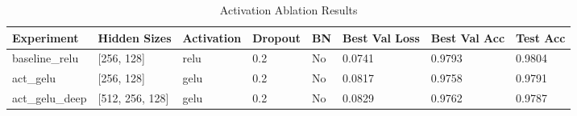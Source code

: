 \begin{table}[t]
    \centering
    \caption{Activation Ablation Results}
    \label{tab:activation_ablation}
    \begin{tabular}{llllllll}
        \toprule
        Experiment & Hidden Sizes & Activation & Dropout & BN & Best Val Loss & Best Val Acc & Test Acc \\
        \midrule
        baseline_relu & [256, 128] & relu & 0.2 & No & 0.0741 & 0.9793 & 0.9804 \\
        act_gelu & [256, 128] & gelu & 0.2 & No & 0.0817 & 0.9758 & 0.9791 \\
        act_gelu_deep & [512, 256, 128] & gelu & 0.2 & No & 0.0829 & 0.9762 & 0.9787 \\
        \bottomrule
    \end{tabular}
\end{table}